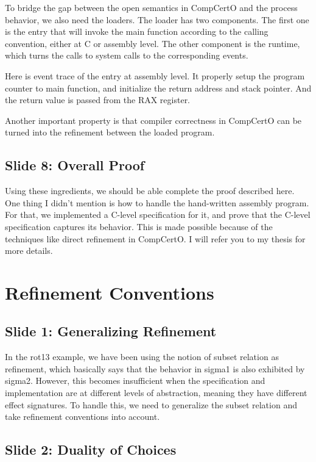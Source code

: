 \documentclass{article}
\begin{document}
To bridge the gap between the open semantics in CompCertO and the process
behavior, we also need the loaders. The loader has two components. The first one
is the entry that will invoke the main function according to the calling
convention, either at C or assembly level. The other component is the runtime,
which turns the calls to system calls to the corresponding events.

Here is event trace of the entry at assembly level. It properly setup the
program counter to main function, and initialize the return address and stack
pointer. And the return value is passed from the RAX register.

Another important property is that compiler correctness in CompCertO can be
turned into the refinement between the loaded program.

\subsection{Slide 8: Overall Proof}

Using these ingredients, we should be able complete the proof described here.
One thing I didn't mention is how to handle the hand-written assembly program.
For that, we implemented a C-level specification for it, and prove that the
C-level specification captures its behavior. This is made possible because of
the techniques like direct refinement in CompCertO. I will refer you to my
thesis for more details.

\section{Refinement Conventions}

\subsection{Slide 1: Generalizing Refinement}

In the rot13 example, we have been using the notion of subset relation as
refinement, which basically says that the behavior in sigma1 is also exhibited
by sigma2. However, this becomes insufficient when the specification and
implementation are at different levels of abstraction, meaning they have
different effect signatures. To handle this, we need to generalize the subset
relation and take refinement conventions into account.

\subsection{Slide 2: Duality of Choices}
\end{document}
